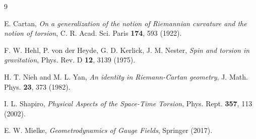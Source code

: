 \documentclass[a4paper,12pt]{article}
\theoremstyle{definition}
\theoremstyle{plain}
\theoremstyle{remark}
\begin{document}
\newpage
\setcounter{tocdepth}{2}

\tableofcontents
\newpage

















%

%

\begin{thebibliography}{9}

E. Cartan, \textit{On a generalization of the notion of Riemannian curvature and the notion of torsion}, 
C. R. Acad. Sci. Paris \textbf{174}, 593 (1922).

F. W. Hehl, P. von der Heyde, G. D. Kerlick, J. M. Nester, \textit{Spin and torsion in gravitation}, 
Phys. Rev. D \textbf{12}, 3139 (1975).

H. T. Nieh and M. L. Yan, \textit{An identity in Riemann-Cartan geometry}, 
J. Math. Phys. \textbf{23}, 373 (1982).

I. L. Shapiro, \textit{Physical Aspects of the Space-Time Torsion}, 
Phys. Rept. \textbf{357}, 113 (2002).

E. W. Mielke, \textit{Geometrodynamics of Gauge Fields}, 
Springer (2017).

\end{thebibliography}
\end{document}

